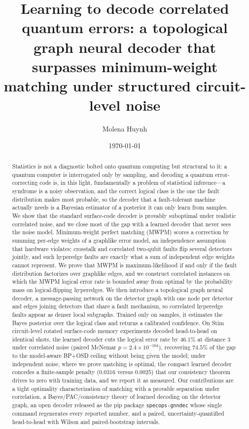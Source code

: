 \documentclass[aps,prxquantum,twocolumn,superscriptaddress,nofootinbib,longbibliography]{revtex4-2}
\newcommand{\res}[1]{#1}
\begin{document}
\title{Learning to decode correlated quantum errors: a topological graph neural
decoder that surpasses minimum-weight matching under structured circuit-level
noise}

\author{Molena Huynh}

\date{\today}

\begin{abstract}
Statistics is not a diagnostic bolted onto quantum computing but structural to
it: a quantum computer is interrogated only by sampling, and decoding a
quantum error-correcting code is, in this light, fundamentally a problem of
statistical inference---a syndrome is a noisy observation, and the correct
logical class is the one the fault distribution makes most probable, so the
decoder that a fault-tolerant machine actually needs is a Bayesian estimator of
a posterior it can only learn from samples. We show that the standard
surface-code decoder is provably suboptimal under
realistic correlated noise, and we close most of the gap with a learned decoder
that never sees the noise model. Minimum-weight perfect matching (MWPM) scores a
correction by summing per-edge weights of a graphlike error model, an
independence assumption that hardware violates: crosstalk and correlated
two-qubit faults flip several detectors jointly, and such hyperedge faults are
exactly what a sum of independent edge weights cannot represent. We prove that
MWPM is maximum-likelihood if and only if the fault distribution factorizes over
graphlike edges, and we construct correlated instances on which the MWPM logical
error rate is bounded away from optimal by the probability mass on
logical-flipping hyperedges. We then introduce a topological graph neural
decoder, a message-passing network on the detector graph with one node per
detector and edges joining detectors that share a fault mechanism, so correlated
hyperedge faults appear as denser local subgraphs. Trained only on samples, it
estimates the Bayes posterior over the logical class and returns a calibrated
confidence. On Stim circuit-level rotated surface-code memory experiments decoded
head-to-head on identical shots, the learned decoder cuts the logical error rate by $\res{46.1}\%$ at distance $3$ under correlated noise (paired McNemar
$p=\res{2.4\times10^{-164}}$), recovering $\res{74.5}\%$ of the gap to the
model-aware BP+OSD ceiling without being given the model; under independent
noise, where we prove matching is optimal, the compact learned decoder concedes a
finite-sample penalty ($\res{0.0316}$ versus $\res{0.0025}$) that our consistency
theorem drives to zero with training data, and we report it as measured. Our
contributions are a tight optimality characterization of matching with a provable
separation under correlation, a Bayes/PAC/consistency theory of learned decoding
on the detector graph, an open decoder released as the pip package
\texttt{specops-gnndec} whose single command regenerates every reported number,
and a paired, uncertainty-quantified head-to-head with Wilson and
paired-bootstrap intervals.
\end{abstract}
\end{document}
